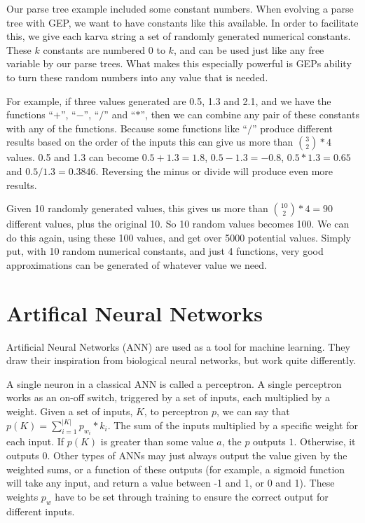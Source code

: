 \documentclass[a4paper,11pt]{report}
\begin{document}
Our parse tree example included some constant numbers. When evolving a parse tree with GEP, we want 
to have constants like this available. In order to facilitate this, we give each karva string a set 
of randomly generated numerical constants. These $k$ constants are numbered 0 to $k$, and can be 
used just like any free variable by our parse trees. What makes this especially powerful is GEPs 
ability to turn these random numbers into any value that is needed. 

For example, if three values generated are 0.5, 1.3 and 2.1, and we have the functions ``$+$'', ``$-$'', 
``$/$'' and ``$*$'', then we can combine any pair of these constants with any of the functions. 
Because some functions like ``$/$'' produce
different results based on the order of the inputs this 
can give us more than ${3 \choose 2} * 4$ values. 0.5 and 1.3 can become $0.5 + 1.3 = 1.8$, 
$0.5 - 1.3 = -0.8$, $0.5 * 1.3 = 0.65$ and $0.5 / 1.3 =  0.3846$. Reversing the minus or divide will 
produce even more results. 

Given 10 randomly generated values, this gives us more than 
${10 \choose 2} * 4 = 90$ different values, plus the original 10. So 10 random values becomes 100. 
We can do this again, using these 100 values, and get over 5000 potential values. Simply put, with 
10 random numerical constants, and just 4 functions, very good approximations can be generated 
of whatever value we need. 

\section{Artifical Neural Networks}

Artificial Neural Networks (ANN) are used as a tool for machine learning. They draw their inspiration 
from biological neural networks, but work quite differently.

A single neuron in a classical ANN is called a perceptron. A single perceptron works as an on-off switch, 
triggered by a set of inputs, each multiplied by a weight. Given a set of inputs, $K$, to perceptron $p$, we can 
say that $p(K) = \sum\limits_{i=1}^{|K|} p_{w_i} * k_i $. The sum of the inputs multiplied by a specific 
weight for each input. If $p(K)$ is greater than some value $a$, the $p$ outputs $1$. Otherwise, it outputs $0$. 
Other types of ANNs may just always output the value given by the weighted sums, or a function of these outputs 
(for example, a sigmoid function will take any input, and return a value between -1 and 1, or 0 and 1).
These weights $p_w$ have to be set through training to ensure the correct output for different inputs. 
\end{document}
